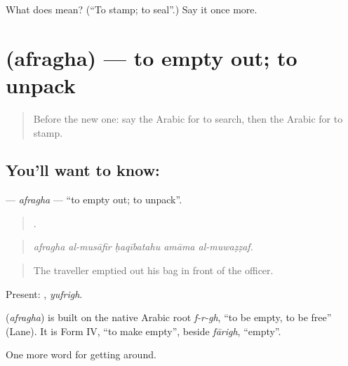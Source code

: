 \begin{tcolorbox}[breakable,colback=teal!4,colframe=teal!35!black,title={Before you move on}]
What does  mean? (\textquotedblleft{}To stamp; to seal\textquotedblright{}.) Say it once more.
\end{tcolorbox}
\section[\texorpdfstring{\ar{أفرغ} (afragha)}{أفرغ (afragha)}]{ (afragha) — to empty out; to unpack}

\label{lesson:AR-C426-afragha}



\begin{quote}
Before the new one: say the Arabic for to search, then the Arabic for to stamp.
\end{quote}

\subsection*{You'll want to know: }
\textbf{} — \emph{afragha} — \textquotedblleft{}to empty out; to unpack\textquotedblright{}.

\begin{quote}
    .
\end{quote}

\begin{quote}
\emph{afragha al-musāfir ḥaqībatahu amāma al-muwaẓẓaf.}
\end{quote}

\begin{quote}
The traveller emptied out his bag in front of the officer.
\end{quote}

Present: , \emph{yufrigh}.

\begin{cousinweb}
\textbf{} (\emph{afragha}) is built on the native Arabic root \emph{f-r-gh}, \textquotedblleft{}to be empty, to be free\textquotedblright{} (Lane). It is Form IV, \textquotedblleft{}to make empty\textquotedblright{}, beside \emph{fārigh}, \textquotedblleft{}empty\textquotedblright{}.
\end{cousinweb}

\begin{grammarlens}[title={What you've built}]
One more word for getting around.
\end{grammarlens}

